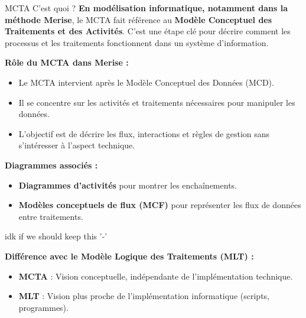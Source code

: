 \documentclass{beamer}
\begin{document}
\begin{frame}{MCTA C'est quoi ?}
    \textbf{En modélisation informatique, notamment dans la méthode Merise}, le MCTA fait référence au 
    \textbf{Modèle Conceptuel des Traitements et des Activités}. C'est une étape clé pour décrire comment les processus et les traitements fonctionnent dans un système d'information.
    
    \vspace{1em}
    \textbf{Rôle du MCTA dans Merise :}
    \begin{itemize}
        \item Le MCTA intervient après le Modèle Conceptuel des Données (MCD).
        \item Il se concentre sur les activités et traitements nécessaires pour manipuler les données.
        \item L'objectif est de décrire les flux, interactions et règles de gestion sans s'intéresser à l'aspect technique.
    \end{itemize}
    
    \vspace{1em}
    \textbf{Diagrammes associés :}
    \begin{itemize}
        \item \textbf{Diagrammes d'activités} pour montrer les enchaînements.
        \item \textbf{Modèles conceptuels de flux (MCF)} pour représenter les flux de données entre traitements.
    \end{itemize}

\end{frame}

\begin{frame}{idk if we should keep this '-'}

    
    \textbf{Différence avec le Modèle Logique des Traitements (MLT) :}
    \begin{itemize}
        \item \textbf{MCTA} : Vision conceptuelle, indépendante de l'implémentation technique.
        \item \textbf{MLT} : Vision plus proche de l'implémentation informatique (scripts, programmes).
    \end{itemize}
    
\end{frame}
\end{document}
